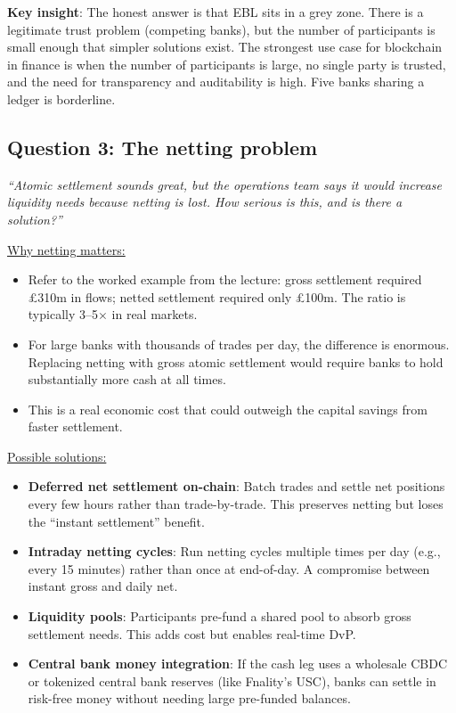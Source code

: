 \documentclass[11pt]{article}
\begin{document}
\medskip
\noindent\textbf{Key insight}: The honest answer is that EBL sits in a grey zone. There is a legitimate trust problem (competing banks), but the number of participants is small enough that simpler solutions exist. The strongest use case for blockchain in finance is when the number of participants is large, no single party is trusted, and the need for transparency and auditability is high. Five banks sharing a ledger is borderline.

\subsection*{Question 3: The netting problem}

\textit{``Atomic settlement sounds great, but the operations team says it would increase liquidity needs because netting is lost. How serious is this, and is there a solution?''}

\medskip
\noindent\underline{Why netting matters:}
\begin{itemize}[leftmargin=*]
\item Refer to the worked example from the lecture: gross settlement required \pounds 310m in flows; netted settlement required only \pounds 100m. The ratio is typically 3--5$\times$ in real markets.
\item For large banks with thousands of trades per day, the difference is enormous. Replacing netting with gross atomic settlement would require banks to hold substantially more cash at all times.
\item This is a real economic cost that could outweigh the capital savings from faster settlement.
\end{itemize}

\medskip
\noindent\underline{Possible solutions:}
\begin{itemize}[leftmargin=*]
\item \textbf{Deferred net settlement on-chain}: Batch trades and settle net positions every few hours rather than trade-by-trade. This preserves netting but loses the ``instant settlement'' benefit.
\item \textbf{Intraday netting cycles}: Run netting cycles multiple times per day (e.g., every 15 minutes) rather than once at end-of-day. A compromise between instant gross and daily net.
\item \textbf{Liquidity pools}: Participants pre-fund a shared pool to absorb gross settlement needs. This adds cost but enables real-time DvP.
\item \textbf{Central bank money integration}: If the cash leg uses a wholesale CBDC or tokenized central bank reserves (like Fnality's USC), banks can settle in risk-free money without needing large pre-funded balances.
\end{itemize}
\end{document}
